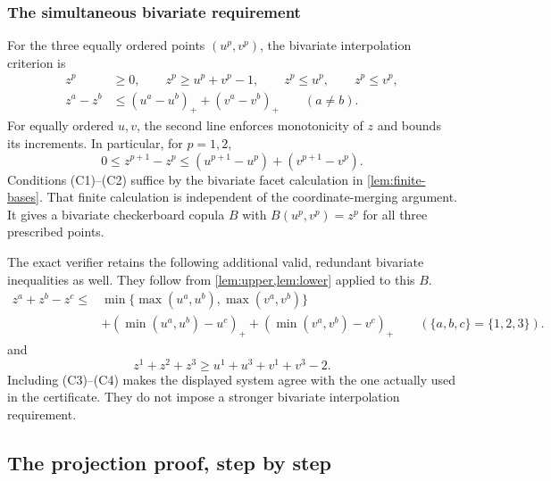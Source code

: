 \documentclass[a4paper,11pt]{amsart}
\numberwithin{equation}{section}
\theoremstyle{definition}
\theoremstyle{remark}
\begin{document}
\subsubsection{The simultaneous bivariate requirement}
For the three equally ordered points $(u^p,v^p)$, the bivariate interpolation criterion is
\begin{align}
 z^p&\ge0,\qquad z^p\ge u^p+v^p-1,\qquad
 z^p\le u^p,\qquad z^p\le v^p,
 \tag{C1}\label{eq:C1}\\
 z^a-z^b&\le(u^a-u^b)_++(v^a-v^b)_+\qquad(a\ne b).
 \tag{C2}\label{eq:C2}
\end{align}
For equally ordered $u,v$, the second line enforces monotonicity of $z$
and bounds its increments. In particular, for $p=1,2$,
\[
0\le z^{p+1}-z^p\le(u^{p+1}-u^p)+(v^{p+1}-v^p).
\]
Conditions (C1)--(C2) suffice by the bivariate facet calculation in
\cref{lem:finite-bases}. That finite calculation is independent of the
coordinate-merging argument. It gives a bivariate checkerboard copula
$B$ with $B(u^p,v^p)=z^p$ for all three prescribed points.

The exact verifier retains the following additional valid, redundant
bivariate inequalities as well. They follow from \cref{lem:upper,lem:lower}
applied to this $B$. 
\begin{equation}
\begin{aligned}
 z^a+z^b-z^c\le{}&
 \min\bigl\{\max(u^a,u^b),\max(v^a,v^b)\bigr\}\\
 &+(\min(u^a,u^b)-u^c)_+
  +(\min(v^a,v^b)-v^c)_+
 \qquad(\{a,b,c\}=\{1,2,3\}).
\end{aligned}
\tag{C3}\label{eq:C3}
\end{equation}
 and
\begin{equation}
 z^1+z^2+z^3\ge u^1+u^3+v^1+v^3-2.
 \tag{C4}\label{eq:C4}
\end{equation}
Including (C3)--(C4) makes the displayed system agree with the one actually
used in the certificate. They do not impose a stronger bivariate interpolation
requirement.

\subsection{The projection proof, step by step}\label{subsec:merge-proof}
\end{document}
